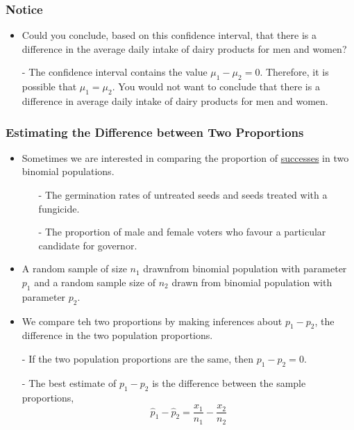 \documentclass[12pt, letterpaper]{article}
\begin{document}
                \subsubsection*{Notice}
                \begin{itemize}
                    \item Could you conclude, based on this confidence interval, that there is a difference in the average daily intake of dairy products for men and women?
                    \item[-] The confidence interval contains the value $\mu_1 - \mu_2 = 0$. Therefore, it is possible that $\mu_1 = \mu_2$. You would not want to conclude that there is a difference in average daily intake of dairy products for men and women. 
                \end{itemize}
            \subsubsection{Estimating the Difference between Two Proportions}
                \begin{itemize}
                    \item Sometimes we are interested in comparing the proportion of \underline{successes} in two binomial populations.
                    \begin{itemize}
                        \item[-] The germination rates of untreated seeds and seeds treated with a fungicide.
                        \item[-] The proportion of male and female voters who favour a particular candidate for governor.
                    \end{itemize}
                    \item A random sample of size $n_1$ drawnfrom binomial population with parameter $p_1$ and a random sample size of $n_2$ drawn from binomial population with parameter $p_2$.
                    \item We compare teh two proportions by making inferences about $p_1 - p_2$, the difference in the two population proportions.
                    \item[-] If the two population proportions are the same, then $p_1 - p_2 = 0$.
                    \item[-] The best estimate of $p_1 - p_2$ is the difference between the sample proportions, $$\hat{p}_1 - \hat{p}_2 = \frac{x_1}{n_1} - \frac{x_2}{n_2}$$
                \end{itemize}
\end{document}

